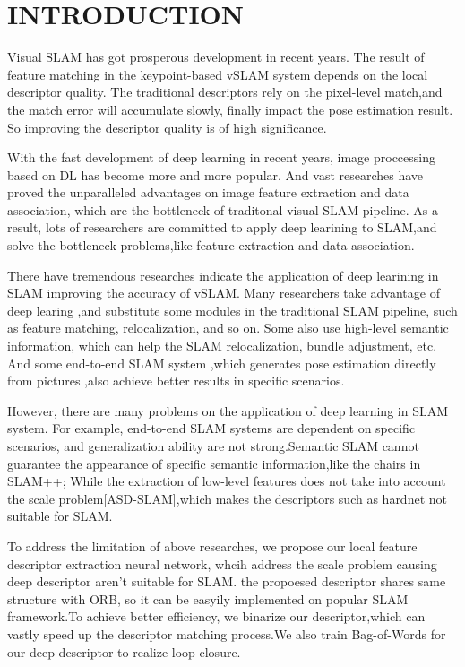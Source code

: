 \documentclass{svproc}
\begin{document}
\section{INTRODUCTION}

Visual SLAM has got prosperous development in recent years. The result of feature matching in the keypoint-based vSLAM system depends on the local descriptor quality. The traditional descriptors rely on the pixel-level match,and the match error will accumulate slowly, finally impact the pose estimation result. So improving the descriptor quality is of high significance.

With the fast development of deep learning in recent years,  image proccessing based on DL has become more and more popular. And vast researches have proved the unparalleled advantages on image feature extraction and data association, which are the bottleneck of traditonal visual SLAM pipeline. As a result, lots of researchers are committed to apply deep learining to SLAM,and solve the bottleneck problems,like feature extraction and data association.

There have tremendous researches indicate the application of deep learining in SLAM improving the accuracy of vSLAM. Many researchers take advantage of deep learing ,and substitute some modules in the traditional SLAM pipeline, such as feature matching, relocalization, and so on. Some also use high-level semantic information, which can help the SLAM relocalization, bundle adjustment, etc. And some end-to-end SLAM system  ,which generates pose estimation directly from pictures ,also achieve better results in specific scenarios.

However, there are many problems on the application of deep learning in SLAM system. For example, end-to-end SLAM systems are dependent on specific scenarios, and generalization ability are not strong.Semantic SLAM cannot guarantee the  appearance of specific semantic information,like the chairs in SLAM++; While the extraction of low-level features does not take into account the scale problem[ASD-SLAM],which makes the descriptors such as hardnet not suitable for SLAM.

To address the limitation of above researches, we propose our local feature descriptor extraction neural network, whcih address the scale problem causing deep descriptor aren't suitable for SLAM. the propoesed descriptor shares same structure with ORB, so it can be  easyily implemented on popular SLAM framework.To achieve better efficiency, we binarize our descriptor,which can vastly speed up the descriptor matching process.We also train Bag-of-Words for our deep descriptor to realize loop closure. 
\end{document}

